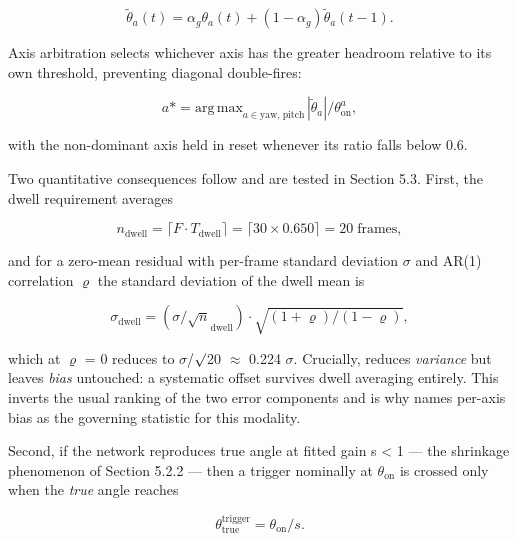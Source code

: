 \begin{equation}
\label{eq:126}
\tilde{\theta }_a(t) = \alpha _g \theta _a(t) + ( 1 - \alpha _g ) \tilde{\theta }_a(t-1).
\end{equation}

Axis arbitration selects whichever axis has the greater headroom relative to its own threshold, preventing diagonal double-fires:

\begin{equation}
\label{eq:127}
a* = \mathrm{arg\,\mathrm{max}}_{a \in {\text{yaw}, \;\text{pitch}}} | \tilde{\theta }_a | / \theta _{\mathrm{on}}^a ,
\end{equation}

with the non-dominant axis held in reset whenever its ratio falls below 0.6.

Two quantitative consequences follow and are tested in Section 5.3. First, the dwell requirement averages

\begin{equation}
\label{eq:128}
n_{\mathrm{dwell}} = \lceil F \cdot T_{\mathrm{dwell}} \rceil = \lceil 30 \times 0.650 \rceil = 20 \;\text{frames},
\end{equation}

and for a zero-mean residual with per-frame standard deviation $\sigma$ and AR(1) correlation $\varrho$ the standard deviation of the dwell mean is

\begin{equation}
\label{eq:129}
\sigma _{\mathrm{dwell}} = ( \sigma / \sqrt{n}_{\mathrm{dwell}} ) \cdot \sqrt{( 1 + \varrho ) / ( 1 - \varrho )} ,
\end{equation}

which at $\varrho$ = 0 reduces to $\sigma$/$\surd$20 $\approx$ 0.224 $\sigma$. Crucially,  reduces \emph{variance} but leaves \emph{bias} untouched: a systematic offset survives dwell averaging entirely. This inverts the usual ranking of the two error components and is why  names per-axis bias as the governing statistic for this modality.

Second, if the network reproduces true angle at fitted gain s < 1 --- the shrinkage phenomenon of Section 5.2.2 --- then a trigger nominally at $\theta_{\mathrm{on}}$ is crossed only when the \emph{true} angle reaches

\begin{equation}
\label{eq:130}
\theta _{\mathrm{true}}^{\mathrm{trigger}} = \theta _{\mathrm{on}} / s .
\end{equation}

